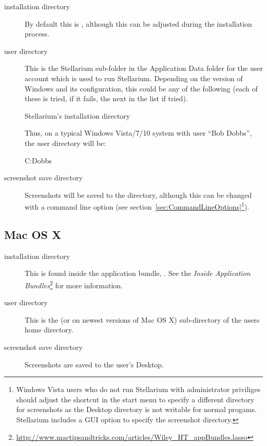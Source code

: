 \begin{description}
\item[installation directory] By default this is
  ,
  although this can be adjusted during the installation process.
\item[user directory] This is the Stellarium sub-folder in the
  Application Data folder for the user account which is used to run
  Stellarium. Depending on the version of Windows and its configuration,
  this could be any of the following (each of these is tried, if it
  fails, the next in the list if tried).

\begin{commands}
Stellarium's installation directory
\end{commands}

Thus, on a typical Windows Vista/7/10 system with user ``Bob
Dobbs'', the user directory will be:

\begin{commands}
C:\Users\Bob Dobbs\AppData\Roaming\Stellarium\
\end{commands}

\item[screenshot save directory] Screenshots will be saved to the
  \file{Pictures/Stellarium} directory, although this can be changed with a command line option (see
  section~\ref{sec:CommandLineOptions}\footnote{Windows Vista users who do not run Stellarium with
    administrator priviliges should adjust the shortcut in the start
    menu to specify a different directory for screenshots as the Desktop
    directory is not writable for normal progams. 
    Stellarium includes a GUI option to specify the screenshot
    directory.}).

\end{description}

\subsection{Mac OS X}
\label{sec:FilesAndDirectories:MacOSX}

\begin{description}
\item[installation directory] This is found inside the application
  bundle, \file{Stellarium.app}. See the \emph{Inside Application
    Bundles}\footnote{\url{http://www.mactipsandtricks.com/articles/Wiley_HT_appBundles.lasso}}
  for more information.
\item[user directory] This is the
   (or
   on
  newest versions of Mac OS X) sub-directory of the users home
  directory.
\item[screenshot save directory] Screenshots are saved to the user's
  Desktop.
\end{description}

